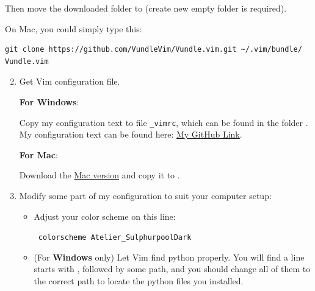 \documentclass{article}
\newcommand\command[1]{\texttt{\centering #1}}
\begin{document}
\begin{enumerate}
\begin{enumerate}
                Then move the downloaded folder to  (create new empty
                folder is required).

                On Mac, you could simply type this:

        \end{enumerate}
            
\begin{verbatim}
git clone https://github.com/VundleVim/Vundle.vim.git ~/.vim/bundle/ Vundle.vim
\end{verbatim}

        \begin{enumerate}
            \setcounter{enumii}{1}
            \item Get Vim configuration file.
                
                \textbf{For Windows}:
                
                Copy my configuration text to file \texttt{\_vimrc},
                which can be found in the folder . My configuration text can be found here:
                \href{https://github.com/we-taper/vimConfig/blob/master/_vimrc}
                {My GitHub Link}.

                \textbf{For Mac}:

                Download the
                \href{https://raw.githubusercontent.com/we-taper/vimConfig/master/vimrc-mac}{Mac
                version} and copy it to .

            \item Modify some part of my configuration to suit your
                computer setup:
                \begin{itemize}
                    \item Adjust your color scheme on this line:

                        \command{ colorscheme~Atelier\_SulphurpoolDark }

                    \item (For \textbf{Windows} only) Let Vim find
                        python properly. You will find a line starts
                        with , followed by
                        some path, and you should change all of them
                        to the correct path to locate the python files
                        you installed.


\end{itemize}
\end{enumerate}
\end{enumerate}
\end{document}
